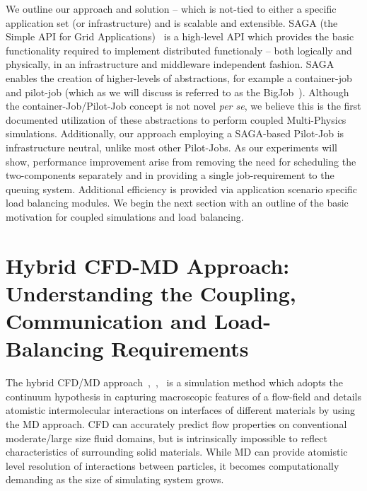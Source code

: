 \documentclass[conference,final]{IEEEtran}
\begin{document}
We outline our approach and solution -- which is not-tied to either a specific application set (or infrastructure) and is scalable and extensible. SAGA (the Simple API for Grid Applications)~\cite{saga_web} is a high-level API which provides the basic functionality required to implement distributed functionaly -- both logically and physically, in an infrastructure and middleware independent fashion.  SAGA enables the creation of higher-levels of abstractions, for example a container-job and pilot-job (which as we will discuss is referred to as the BigJob~\cite{saga_royalsoc}). %
Although the container-Job/Pilot-Job concept is not novel {\it per se}, we believe this is the first documented utilization of these abstractions to perform coupled Multi-Physics simulations. Additionally, our approach employing a SAGA-based Pilot-Job is infrastructure neutral, unlike most other Pilot-Jobs.  As our experiments will show, performance improvement %
arise from removing the need for scheduling the two-components separately and in providing a single job-requirement to the queuing system. Additional efficiency is provided via application scenario specific load balancing modules.  We begin the next section with an outline of the basic motivation for coupled simulations and load balancing.


\section{Hybrid CFD-MD Approach: Understanding the Coupling, Communication and Load-Balancing Requirements}


The hybrid CFD/MD approach~\cite{Thompson},~\cite{Nie},~\cite{Yen} is a simulation method which adopts the continuum hypothesis in capturing macroscopic features of a flow-field and details atomistic intermolecular interactions on interfaces of different materials by using the MD approach. CFD can accurately predict flow properties on conventional moderate/large size fluid domains, but is intrinsically impossible to reflect characteristics of surrounding solid materials. While MD can provide atomistic level resolution of interactions between particles, it becomes computationally demanding as the size of simulating system grows.
\end{document}
